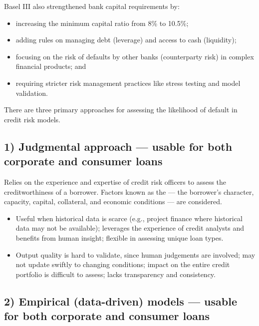 Basel III also strengthened bank capital requirements by:

\begin{itemize}
\item increasing the minimum capital ratio from 8\% to 10.5\%;
\item adding rules on managing debt (leverage) and access to cash (liquidity);
\item focusing on the risk of defaults by other banks (counterparty risk) in
complex financial products; and
\item requiring stricter risk management practices like stress testing and model
validation.
\end{itemize}


There are three primary approaches for assessing the likelihood of default in
credit risk models.

\subsection*{1) Judgmental approach --- usable for both corporate and consumer loans}

Relies on the experience and expertise of credit risk officers to assess the
creditworthiness of a borrower. Factors known as the  --- the
borrower's character, capacity, capital, collateral, and economic conditions ---
are considered.

\begin{itemize}
\item {} Useful when historical data is scarce (e.g., project
finance where historical data may not be available); leverages the experience of
credit analysts and benefits from human insight; flexible in assessing unique
loan types.
\item {} Output quality is hard to validate, since human
judgements are involved; may not update swiftly to changing conditions; impact on
the entire credit portfolio is difficult to assess; lacks transparency and
consistency.
\end{itemize}

\subsection*{2) Empirical (data-driven) models --- usable for both corporate and consumer loans}

